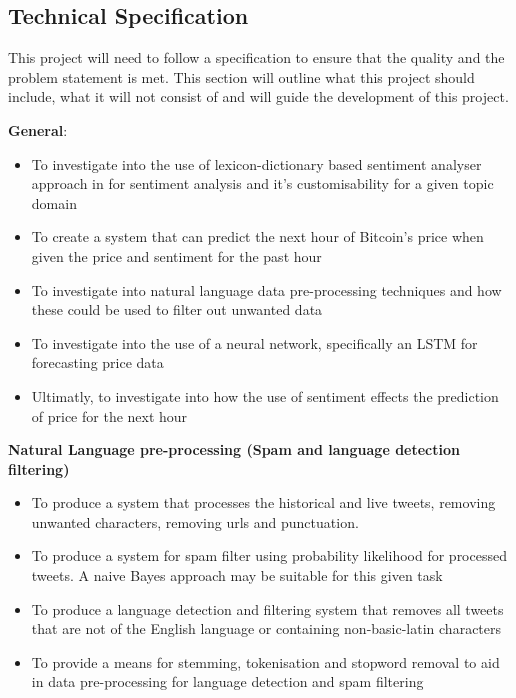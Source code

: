 \documentclass[oneside, 12pt]{article}
\begin{document}
		\newpage
		\subsection{Technical Specification}
		This project will need to follow a specification to ensure that the quality and the problem statement is met. This section will outline what this project should include, what it will not consist of and will guide the development of this project.
		\newline
		
		\textbf{General}:
		\begin{itemize}
			\item To investigate into the use of lexicon-dictionary based sentiment analyser approach in for sentiment analysis and it's customisability for a given topic domain
			\item To create a system that can predict the next hour of Bitcoin’s price when given the price and sentiment for the past hour
			\item To investigate into natural language data pre-processing techniques and how these could be used to filter out unwanted data
			\item To investigate into the use of a neural network, specifically an LSTM for forecasting price data
			\item Ultimatly, to investigate into how the use of sentiment effects the prediction of price for the next hour
			\newline
		\end{itemize}
		
	
		\textbf{Natural Language pre-processing (Spam and language detection filtering)}
		\begin{itemize}
			\item To produce a system that processes the historical and live tweets, removing unwanted characters, removing urls and punctuation.
			\item To produce a system for spam filter using probability likelihood for processed tweets. A naive Bayes approach may be suitable for this given task
			\item To produce a language detection and filtering system that removes all tweets that are not of the English language or containing non-basic-latin characters
			\item To provide a means for stemming, tokenisation and stopword removal to aid in data pre-processing for language detection and spam filtering
			\newline
		\end{itemize}
		
\end{document}
